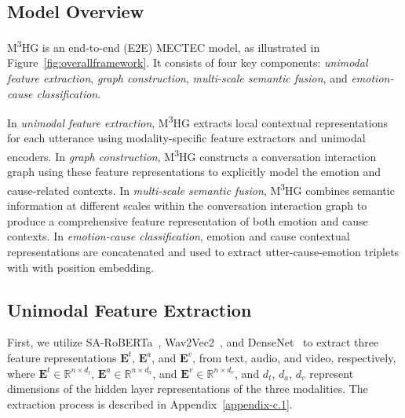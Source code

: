 \documentclass[11pt]{article}
\begin{document}
\subsection{Model Overview}
M\textsuperscript{3}HG is an end-to-end (E2E) MECTEC model, as illustrated in Figure~\ref{fig:overallframework}.
It consists of four key components: \textit{unimodal feature extraction}, \textit{graph construction}, \textit{multi-scale semantic fusion}, and \textit{emotion-cause classification}.

In \textit{unimodal feature extraction},  M\textsuperscript{3}HG extracts local contextual representations for each utterance using modality-specific feature extractors and unimodal encoders.
In \textit{graph construction}, M\textsuperscript{3}HG constructs a conversation interaction graph using these feature representations to explicitly model the emotion and cause-related contexts.
In \textit{multi-scale semantic fusion}, M\textsuperscript{3}HG combines semantic information at different scales within the conversation interaction graph to produce a comprehensive feature representation of both emotion and cause contexts.
In \textit{emotion-cause classification}, emotion and cause contextual representations are concatenated and used to extract utter-cause-emotion triplets with with position embedding.

\subsection{Unimodal Feature Extraction}
First, we utilize SA-RoBERTa~\cite{SA-RoBERTa}, Wav2Vec2~\cite{wav2vec2}, and DenseNet~\cite{DenseNet} to extract three feature representations $\bm{E}^t$, $\bm{E}^a$, and  $\bm{E}^v$, from text, audio, and video, respectively, where $\bm{E}^t \in \mathbb{R}^{n \times d_t}$, $\bm{E}^a \in \mathbb{R}^{n \times d_a}$, and  $\bm{E}^v \in \mathbb{R}^{n \times d_v}$, and  $d_t$, $d_a$, $d_v$ represent dimensions of the hidden layer representations of the three modalities.
The extraction process is described in Appendix~\ref{appendix-c.1}.
\end{document}
